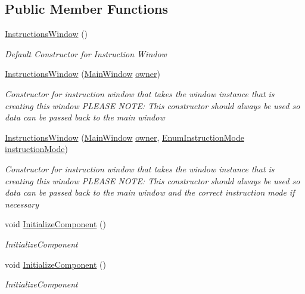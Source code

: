 \subsection*{Public Member Functions}
\begin{DoxyCompactItemize}
\item 
\hyperlink{class_c_p_u___o_s___simulator_1_1_instructions_window_aa482ef12f9c98458bedcc3c07d696879}{Instructions\+Window} ()
\begin{DoxyCompactList}\small\item\em Default Constructor for Instruction Window \end{DoxyCompactList}\item 
\hyperlink{class_c_p_u___o_s___simulator_1_1_instructions_window_a5ed238dc308dcc976400105a3973deb0}{Instructions\+Window} (\hyperlink{class_c_p_u___o_s___simulator_1_1_main_window}{Main\+Window} \hyperlink{class_c_p_u___o_s___simulator_1_1_instructions_window_a954c950c677c61a3b7ed7406b6dc7164}{owner})
\begin{DoxyCompactList}\small\item\em Constructor for instruction window that takes the window instance that is creating this window P\+L\+E\+A\+S\+E N\+O\+T\+E\+: This constructor should always be used so data can be passed back to the main window \end{DoxyCompactList}\item 
\hyperlink{class_c_p_u___o_s___simulator_1_1_instructions_window_afa6f0e58a20268fa56006a775c7959e4}{Instructions\+Window} (\hyperlink{class_c_p_u___o_s___simulator_1_1_main_window}{Main\+Window} \hyperlink{class_c_p_u___o_s___simulator_1_1_instructions_window_a954c950c677c61a3b7ed7406b6dc7164}{owner}, \hyperlink{namespace_c_p_u___o_s___simulator_adc17a5a5e004084f05dc8e4d3f70e31f}{Enum\+Instruction\+Mode} \hyperlink{class_c_p_u___o_s___simulator_1_1_instructions_window_aae7addf8e362e26e981b36b9940a53c0}{instruction\+Mode})
\begin{DoxyCompactList}\small\item\em Constructor for instruction window that takes the window instance that is creating this window P\+L\+E\+A\+S\+E N\+O\+T\+E\+: This constructor should always be used so data can be passed back to the main window and the correct instruction mode if necessary \end{DoxyCompactList}\item 
void \hyperlink{class_c_p_u___o_s___simulator_1_1_instructions_window_a8ad79899f3d5210d66fb5973b721895a}{Initialize\+Component} ()
\begin{DoxyCompactList}\small\item\em Initialize\+Component \end{DoxyCompactList}\item 
void \hyperlink{class_c_p_u___o_s___simulator_1_1_instructions_window_a8ad79899f3d5210d66fb5973b721895a}{Initialize\+Component} ()
\begin{DoxyCompactList}\small\item\em Initialize\+Component \end{DoxyCompactList}\end{DoxyCompactItemize}
